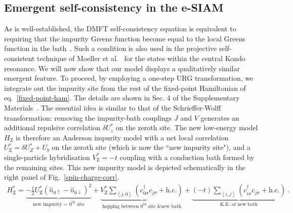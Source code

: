 \documentclass{iopart}
\begin{document}
\subsection{Emergent self-consistency in the e-SIAM}

As is well-established, the DMFT self-consistency equation is equivalent to requiring that the impurity Greens function become equal to the local Greens function in the bath~\cite{georges1996}.
Such a condition is also used in the projective self-consistent technique of Moeller et al.~\cite{moeller_1995} for the states within the central Kondo resonance.
We will now show that our model displays a qualitatively similar emergent feature.
To proceed, by employing a one-step URG transformation, we integrate out the impurity site from the rest of the fixed-point Hamiltonian of eq.~\eqref{fixed-point-ham}.
The details are shown in Sec. 4 of the Supplementary Materials~\cite{supp_mat}. The essential idea is similar to that of the Schrieffer-Wolff transformation: removing the impurity-bath couplings \(J\) and \(V\) generates an additional repulsive correlation \(\delta U_z^* \) on the zeroth site. The new low-energy model \(H_\text{Z}\) is therefore an Anderson impurity model with a net local correlation \(U_\text{Z}^* = \delta U_Z^* + U_b\) on the zeroth site (which is now the ``new impurity site"), and a single-particle hybridisation \(V_\text{Z}^* = -t\) coupling with a conduction bath formed by the remaining sites. This new impurity model is depicted schematically in the right panel of Fig.~\eqref{spin-charge-corr}.
\begin{eqnarray}
	H_\text{Z}^*  = \underbrace{-\frac{1}{2}U_\text{Z}^*\left(\hat n_{0\uparrow} - \hat n_{0\downarrow}\right)^2}_\text{new impurity = \(0^\text{th}\) site} + \underbrace{V_\text{Z}^*\sum_{\left<j,0 \right>}\left(c^\dagger_{0\sigma}c_{j\sigma} + \text{h.c.}\right)}_\text{hopping between \(0^\text{th}\) site \& new bath} + \underbrace{(-t) \sum_{\left<i,j \right>}\left(c^\dagger_{i\sigma}c_{j\sigma} + \text{h.c.}\right)}_\text{K.E. of new bath}~.
\end{eqnarray}
\end{document}
